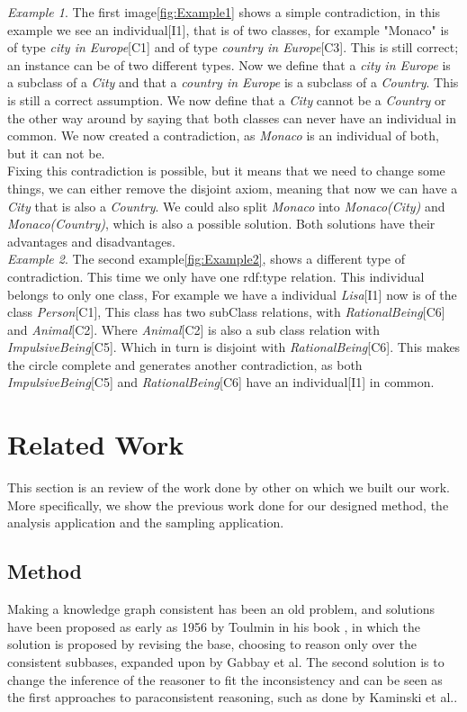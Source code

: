 \documentclass[11pt,letterpaper ,oneside ]{book}
\begin{document}
	\textit{Example 1}. The first image\ref{fig:Example1} shows a simple contradiction, in this example we see an individual[I1], that is of two classes, for example "Monaco" is of type \textit{city in Europe}[C1] and of type \textit{country in Europe}[C3]. This is still correct; an instance can be of two different types. Now we define that a \textit{city in Europe} is a subclass of a \textit{City} and that a \textit{country in Europe} is a subclass of a \textit{Country}. This is still a correct assumption. We now define that a \textit{City} cannot be a \textit{Country} or the other way around by saying that both classes can never have an individual in common. We now created a contradiction, as \textit{Monaco} is an individual of both, but it can not be.\\
	
	Fixing this contradiction is possible, but it means that we need to change some things, we can either remove the disjoint axiom, meaning that now we can have a \textit{City} that is also a \textit{Country}. We could also split \textit{Monaco} into \textit{Monaco(City)} and \textit{Monaco(Country)}, which is also a possible solution. Both solutions have their advantages and disadvantages.\\
	
	\textit{Example 2}. The second example\ref{fig:Example2}, shows a different type of contradiction. This time we only have one rdf:type relation. This individual belongs to only one class, For example we have a individual \textit{Lisa}[I1] now is of the class \textit{Person}[C1], This class has two subClass relations, with \textit{RationalBeing}[C6] and \textit{Animal}[C2]. Where \textit{Animal}[C2] is also a sub class relation with \textit{ImpulsiveBeing}[C5]. Which in turn is disjoint with \textit{RationalBeing}[C6]. This makes the circle complete and generates another contradiction, as both \textit{ImpulsiveBeing}[C5] and \textit{RationalBeing}[C6] have an individual[I1] in common. \\
	
	
	\chapter{Related Work}\label{RelatedWork}
	This section is an review of the work done by other on which we built our work. More specifically, we show the previous work done for our designed method, the analysis application and the sampling application. 
	
	\section{Method}
	Making a knowledge graph consistent has been an old problem, and solutions have been proposed as early as 1956 by Toulmin in his book \cite{toulmin:1956}, in which the solution is proposed by revising the base, choosing to reason only over the consistent subbases, expanded upon by Gabbay et al\cite{Gabbay:1994}. The second solution is to change the inference of the reasoner to fit the inconsistency and can be seen as the first approaches to paraconsistent reasoning, such as done by Kaminski et al.\cite{Kaminski:2015}.
	
\end{document}
